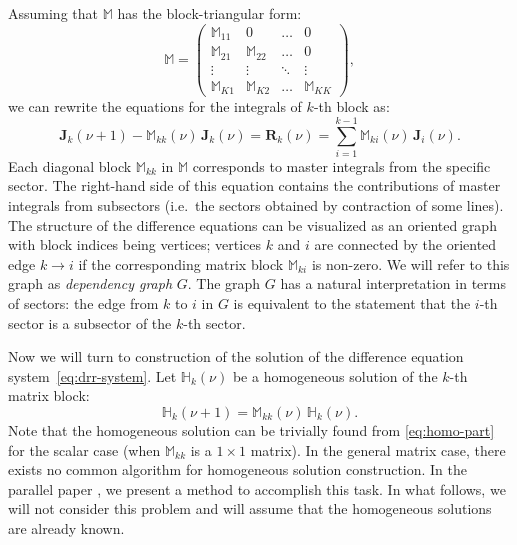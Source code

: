 \documentclass[sort&compress]{elsarticle}
\begin{document}
Assuming that $\mathbb{M}$ has the block-triangular form:
\begin{equation}
	\mathbb{M} = \begin{pmatrix}
		\mathbb{M}_{11} & 0 & \ldots & 0 \\
		\mathbb{M}_{21} & \mathbb{M}_{22} & \ldots & 0 \\
		\vdots & \vdots & \ddots & \vdots \\
		\mathbb{M}_{K1} & \mathbb{M}_{K2} & \ldots & \mathbb{M}_{KK}
	\end{pmatrix},
\end{equation}
we can rewrite the equations for the integrals of $k$-th block as:
\begin{equation}
	\label{eq:drr-system}
	\mathbf{J}_k(\nu+1) - \mathbb{M}_{kk}(\nu) \, \mathbf{J}_k(\nu) = \mathbf{R}_k(\nu) = \sum_{i=1}^{k-1} \mathbb{M}_{ki}(\nu) \, \mathbf{J}_i(\nu).
\end{equation}
Each diagonal block $\mathbb{M}_{kk}$ in $\mathbb{M}$ corresponds to master integrals from the specific sector.
The right-hand side of this equation contains the contributions of master integrals from subsectors (i.e.\ the sectors obtained by contraction of some lines).
The structure of the difference equations can be visualized as an oriented graph with block indices being vertices;
vertices $k$ and $i$ are connected by the oriented edge $k \to i$ if the corresponding matrix block $\mathbb{M}_{ki}$ is non-zero.
We will refer to this graph as \emph{dependency graph} $G$.
The graph $G$ has a natural interpretation in terms of sectors: the edge from $k$ to $i$ in $G$ is equivalent to the statement that the $i$-th sector is a subsector of the $k$-th sector.

Now we will turn to construction of the 	solution of the difference equation system~\eqref{eq:drr-system}.
Let $\mathbb{H}_k(\nu)$ be a homogeneous solution of the $k$-th matrix block:
\begin{equation}
	\label{eq:homo-part}
	\mathbb{H}_k(\nu+1) = \mathbb{M}_{kk}(\nu) \, \mathbb{H}_k(\nu).
\end{equation}
Note that the homogeneous solution can be trivially found from \cref{eq:homo-part} for the scalar case (when $\mathbb{M}_{kk}$ is a $1\times1$ matrix).
In the general matrix case, there exists no common algorithm for homogeneous solution construction.
In the parallel paper \cite{LeeMingulov:Meromorphic}, we present a method to accomplish this task.
In what follows, we will not consider this problem and will assume that the homogeneous solutions are already known.
\end{document}
